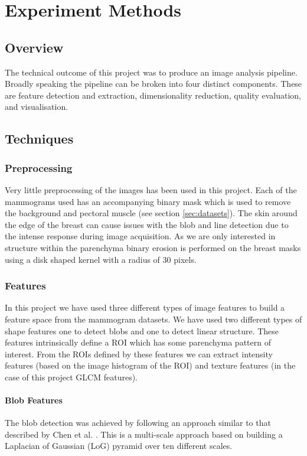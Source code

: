 \chapter{Experiment Methods}

\section{Overview}

The technical outcome of this project was to produce an image analysis pipeline. Broadly speaking the pipeline can be broken into four distinct components. These are feature detection and extraction, dimensionality reduction, quality evaluation, and visualisation.

\section{Techniques}

\subsection{Preprocessing}
Very little preprocessing of the images has been used in this project. Each of the mammograms used has an accompanying binary mask which is used to remove the background and pectoral muscle (see section \ref{sec:datasets}). The skin around the edge of the breast can cause issues with the blob and line detection due to the intense response during image acquisition. As we are only interested in structure within the parenchyma binary erosion is performed on the breast masks using a disk shaped kernel with a radius of 30 pixels.

\subsection{Features}
\label{sec:experiment-features}
In this project we have used three different types of image features to build a feature space from the mammogram datasets. We have used two different types of shape features one to detect blobs and one to detect linear structure. These features intrinsically define a ROI which has some parenchyma pattern of interest. From the ROIs defined by these features we can extract intensity features (based on the image histogram of the ROI) and texture features (in the case of this project GLCM features).

\subsubsection{Blob Features}
\label{subsubsec:implementation-blob-features}
The blob detection was achieved by following an approach similar to that described by Chen et al. \cite{chen2013multiscale, chen2013mammographic}. This is a multi-scale approach based on building a Laplacian of Gaussian (LoG) pyramid over ten different scales. 

